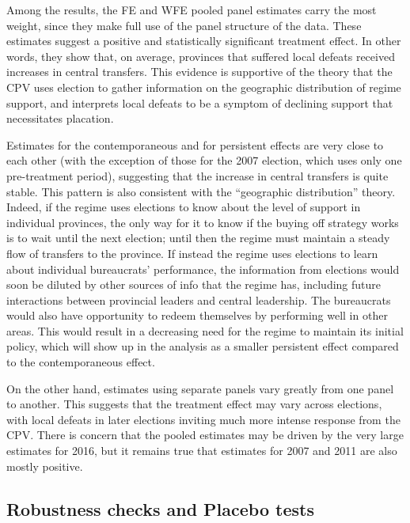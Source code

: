 \documentclass[12pt]{article}\usepackage[]{graphicx}\usepackage[]{color}
\newcommand{\1}{\mathbbm{1}}
\begin{document}
Among the results, the FE and WFE pooled panel estimates carry the most weight, since they make full use of the panel structure of the data. These estimates suggest a positive and statistically significant treatment effect. In other words, they show that, on average, provinces that suffered local defeats received increases in central transfers. This evidence is supportive of the theory that the CPV uses election to gather information on the geographic distribution of regime support, and interprets local defeats to be a symptom of declining support that necessitates placation.

Estimates for the contemporaneous and for persistent effects are very close to each other (with the exception of those for the 2007 election, which uses only one pre-treatment period), suggesting that the increase in central transfers is quite stable. This pattern is also consistent with the ``geographic distribution'' theory. Indeed, if the regime uses elections to know about the level of support in individual provinces, the only way for it to know if the buying off strategy works is to wait until the next election; until then the regime must maintain a steady flow of transfers to the province.  If instead the regime uses elections to learn about individual bureaucrats' performance, the information from elections would soon be diluted by other sources of info that the regime has, including future interactions between provincial leaders and central leadership. The bureaucrats would also have opportunity to redeem themselves by performing well in other areas. This would result in a decreasing need for the regime to maintain its initial policy, which will show up in the analysis as a smaller persistent effect compared to the contemporaneous effect.

On the other hand, estimates using separate panels vary greatly from one panel to another. This suggests that the treatment effect may vary across elections, with local defeats in later elections inviting much more intense response from the CPV. There is concern that the pooled estimates may be driven by the very large estimates for 2016, but it remains true that estimates for 2007 and 2011 are also mostly positive.

\subsection{Robustness checks and Placebo tests}
\end{document}
